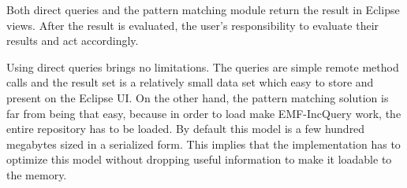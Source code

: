 Both direct queries and the pattern matching module return the result in Eclipse 
views. After the result is evaluated, the user's responsibility to evaluate their
results and act accordingly.

Using direct queries brings no limitations. The queries are simple remote method
calls and the result set is a relatively small data set which easy to store and
present on the Eclipse UI. On the other hand, the pattern matching solution is
far from being that easy, because in order to load make EMF-IncQuery work, the
entire repository has to be loaded. By default this model is a few hundred
megabytes sized in a serialized form. This implies that the implementation has to 
optimize this model without dropping useful information to make it loadable to 
the memory.